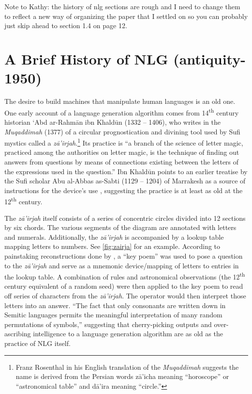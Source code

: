 {\color{red} Note to Kathy: the history of nlg sections are rough and I need to change them to reflect a new way of organizing the paper that I settled on so you can probably just skip ahead to section 1.4 on page 12.}

\section{A Brief History of NLG (antiquity-1950)}

The desire to build machines
that manipulate human languages is an old one. 
One early account of a language generation algorithm 
comes from 
14\textsuperscript{th} century historian 
`Abd ar-Rahm\={a}n ibn Khald\={u}n (1332 -- 1406), who
writes in the \textit{Muqaddimah} (1377) of a circular prognostication 
and divining tool  used by Sufi mystics called a \textit{z\={a}'irjah}.\footnote{Franz Rosenthal in his English translation of the  \textit{Muqaddimah} suggests the name is derived from 
the Persian words z\={a}'icha meaning ``horoscope'' or  ``astronomical table''
 and d\={a}'ira meaning ``circle.''}
 Its practice is
``a branch of the science of letter magic, practiced among the authorities on letter magic, is the technique of finding out answers from questions by means of connections existing between the letters of the expressions used in the question.'' 
Ibn Khald\={u}n points to an earlier treatise by the Sufi scholar 
Abu al-Abbas as-Sabti
(1129 -- 1204) of Marrakesh as a source of instructions for the device's use
\citep{rosenthal1958muqaddimah}, suggesting the practice is at least as
old at the 12\textsuperscript{th} century.

The \textit{z\={a}'irjah} itself consists of a series of concentric circles divided into 12 
sections by six chords. The various segments of the diagram are annotated with 
letters and numerals. Additionally, the \textit{z\={a}'irjah}  is accompanied by a lookup table mapping
letters to numbers. See \autoref{fig:zairja} for an example. According to painstaking reconstructions done by \citep{link2010variantology},
a ``key poem'' was used to pose a question to the \textit{z\={a}'irjah} and serve as a 
mnemonic device/mapping of letters to entries in the lookup table. 
A combination of rules and astronomical observations (the 12\textsuperscript{th} century equivalent of a random seed)
were then applied to the key poem to read off series of characters from
the \textit{z\={a}'irjah}. The operator
would then interpret those letters into an answer.  
``The fact that only consonants are written down in Semitic languages permits the meaningful interpretation of many random permutations of symbols,'' \citep{link2010variantology} suggesting that cherry-picking outputs and over-ascribing 
intelligence to a language generation algorithm are as old as the practice of
 NLG itself.

